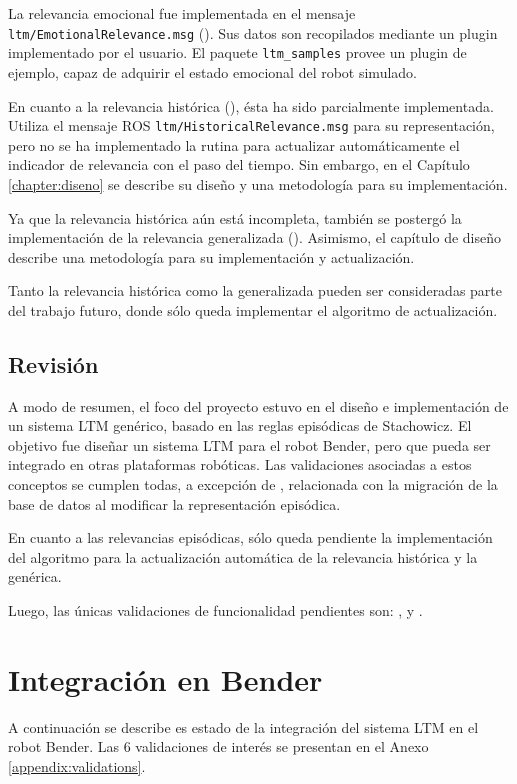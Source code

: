 La relevancia emocional fue implementada en el mensaje \texttt{ltm/EmotionalRelevance.msg} (). Sus datos son recopilados mediante un plugin implementado por el usuario. El paquete \texttt{ltm\_samples} provee un plugin de ejemplo, capaz de adquirir el estado emocional del robot simulado.

En cuanto a la relevancia histórica (), ésta ha sido parcialmente implementada. Utiliza el mensaje ROS \texttt{ltm/HistoricalRelevance.msg} para su representación, pero no se ha implementado la rutina para actualizar automáticamente el indicador de relevancia con el paso del tiempo. Sin embargo, en el Capítulo \ref{chapter:diseno} se describe su diseño y una metodología para su implementación.

Ya que la relevancia histórica aún está incompleta, también se postergó la implementación de la relevancia generalizada (). Asimismo, el capítulo de diseño describe una metodología para su implementación y actualización.

Tanto la relevancia histórica como la generalizada pueden ser consideradas parte del trabajo futuro, donde sólo queda implementar el algoritmo de actualización.


\subsection{Revisión}

A modo de resumen, el foco del proyecto estuvo en el diseño e implementación de un sistema LTM genérico, basado en las reglas episódicas de Stachowicz. El objetivo fue diseñar un sistema LTM para el robot Bender, pero que pueda ser integrado en otras plataformas robóticas. Las validaciones asociadas a estos conceptos se cumplen todas, a excepción de , relacionada con la migración de la base de datos al modificar la representación episódica.

En cuanto a las relevancias episódicas, sólo queda pendiente la implementación del algoritmo para la actualización automática de la relevancia histórica y la genérica.

Luego, las únicas validaciones de funcionalidad pendientes son: ,  y .


\section{Integración en Bender}

A continuación se describe es estado de la integración del sistema LTM en el robot Bender. Las 6 validaciones de interés se presentan en el Anexo \ref{appendix:validations}.

